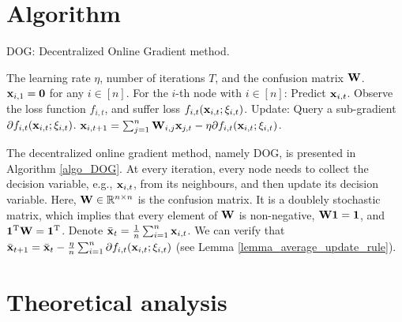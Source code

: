 \documentclass{article}
\begin{document}
\section{Algorithm}


\newcommand\StateX{\Statex\hspace{\algorithmicindent}}
\begin{algorithm}[!]
   \caption{\textsc{DOG}: Decentralized Online Gradient method.}
   \label{algo_DOG}
   \begin{algorithmic}[1]
   \Require The learning rate $\eta$, number of iterations $T$, and the confusion matrix ${\bf W}$. ${\bf x}_{i,1} = {\bf 0}$ for any $i\in [n]$.
           \StateX For the $i$-th node with $i\in[n]$:
            \State \indent Predict ${\bf x}_{i,t}$.
            \State \indent Observe the loss function $f_{i,t}$,
            \StateX \indent and suffer loss $f_{i,t}({\bf x}_{i,t};\xi_{i,t})$.
            \StateX Update:
            \State \indent Query a sub-gradient $\partial f_{i,t}({\bf x}_{i,t};\xi_{i,t})$.  
            \State \indent ${\bf x}_{i,t+1} = \sum_{j=1}^n {\bf W}_{i,j}{\bf x}_{j,t} - \eta \partial f_{i,t}({\bf x}_{i,t};\xi_{i,t})$. 
       \EndFor
   \end{algorithmic}
\end{algorithm}


The decentralized online gradient method, namely \textsc{DOG}, is presented in Algorithm \ref{algo_DOG}. At every iteration, every node needs to collect the decision variable, e.g., ${\bf x}_{i,t}$, from its neighbours, and then update its decision variable.  Here, ${\bf W} \in\mathbb{R}^{n \times n}$ is the confusion matrix. It is a doublely stochastic matrix, which implies that every element of ${\bf W}$ is non-negative, ${\bf W} {\bf 1} = {\bf 1}$, and ${\bf 1}^{\rm T}{\bf W}  = {\bf 1}^{\rm T}$.  Denote $\bar{{\bf x}}_t = \frac{1}{n}\sum_{i=1}^n {\bf x}_{i,t}$. We can verify that $\bar{{\bf x}}_{t+1} =  \bar{{\bf x}}_t -  \frac{\eta}{n}\sum_{i=1}^n \partial f_{i,t}({\bf x}_{i,t};\xi_{i,t})$ (see Lemma \ref{lemma_average_update_rule}). 





\section{Theoretical analysis}
\end{document}

